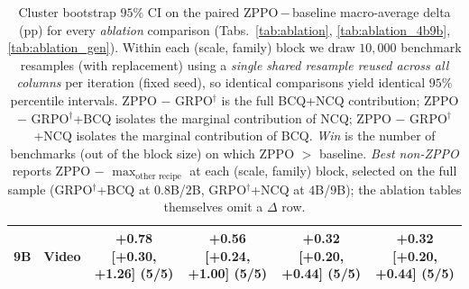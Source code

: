 \begin{table}[!htbp]
{\begin{tabular}{llcccc}
        9B & Video & +0.78 [+0.30, +1.26] (5/5) & +0.56 [+0.24, +1.00] (5/5) & +0.32 [+0.20, +0.44] (5/5) & +0.32 [+0.20, +0.44] (5/5) \\
        \bottomrule
    \end{tabular}%
    }
    \caption{Cluster bootstrap $95\%$ CI on the paired ZPPO\,$-$\,baseline macro-average delta (pp) for every \emph{ablation} comparison (Tabs.~\ref{tab:ablation}, \ref{tab:ablation_4b9b}, \ref{tab:ablation_gen}). Within each (scale, family) block we draw $10{,}000$ benchmark resamples (with replacement) using a \emph{single shared resample reused across all columns} per iteration (fixed seed), so identical comparisons yield identical $95\%$ percentile intervals. ZPPO $-$ GRPO$^{\dagger}$ is the full BCQ+NCQ contribution; ZPPO $-$ GRPO$^{\dagger}$+BCQ isolates the marginal contribution of NCQ; ZPPO $-$ GRPO$^{\dagger}$+NCQ isolates the marginal contribution of BCQ. \emph{Win} is the number of benchmarks (out of the block size) on which ZPPO $>$ baseline. \emph{Best non-ZPPO} reports ZPPO $-$ $\max\nolimits_{\text{other recipe}}$ at each (scale, family) block, selected on the full sample (GRPO$^{\dagger}$+BCQ at $0.8$B/$2$B, GRPO$^{\dagger}$+NCQ at $4$B/$9$B); the ablation tables themselves omit a $\Delta$ row.}
    \label{tab:appendix:ci_ablation}
\end{table}
